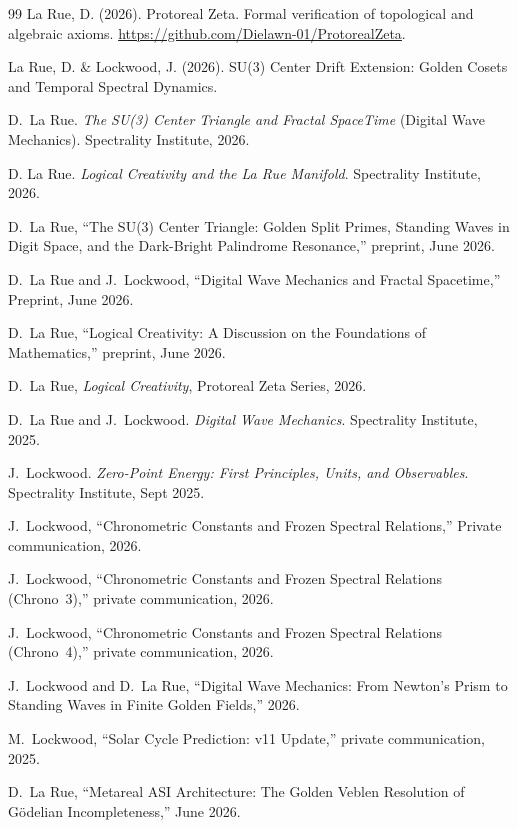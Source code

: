 \begin{thebibliography}{99}
 La Rue, D. (2026). Protoreal Zeta. Formal verification of topological and algebraic axioms. \url{https://github.com/Dielawn-01/ProtorealZeta}.

 La Rue, D. \& Lockwood, J. (2026). SU(3) Center Drift Extension: Golden Cosets and Temporal Spectral Dynamics.

D.~La Rue.
\textit{The SU(3) Center Triangle and Fractal SpaceTime} (Digital Wave Mechanics).
Spectrality Institute, 2026.

D. La Rue.
\textit{Logical Creativity and the La Rue Manifold}.
Spectrality Institute, 2026.

D.~La Rue, ``The SU(3) Center Triangle: Golden Split Primes, Standing Waves in Digit Space, and the Dark-Bright Palindrome Resonance,'' preprint, June 2026.

D.~La Rue and J.~Lockwood,
``Digital Wave Mechanics and Fractal Spacetime,''
Preprint, June 2026.

D.~La Rue, ``Logical Creativity: A Discussion on the Foundations of Mathematics,'' preprint, June 2026.

 D.~La Rue, \emph{Logical Creativity}, Protoreal Zeta Series, 2026.

D.~La Rue and J.~Lockwood.
\textit{Digital Wave Mechanics}.
Spectrality Institute, 2025.

J.~Lockwood.
\textit{Zero-Point Energy: First Principles, Units, and Observables}.
Spectrality Institute, Sept 2025.

J.~Lockwood,
``Chronometric Constants and Frozen Spectral Relations,''
Private communication, 2026.

J.~Lockwood, ``Chronometric Constants and Frozen Spectral Relations (Chrono~3),'' private communication, 2026.

J.~Lockwood, ``Chronometric Constants and Frozen Spectral Relations (Chrono~4),'' private communication, 2026.

J.~Lockwood and D.~La Rue,
``Digital Wave Mechanics: From Newton's Prism to Standing Waves
in Finite Golden Fields,'' 2026.

M.~Lockwood, ``Solar Cycle Prediction: v11 Update,'' private communication, 2025.

D.~La Rue,
``Metareal ASI Architecture: The Golden Veblen Resolution of G\"odelian Incompleteness,''
June 2026.


\end{thebibliography}
